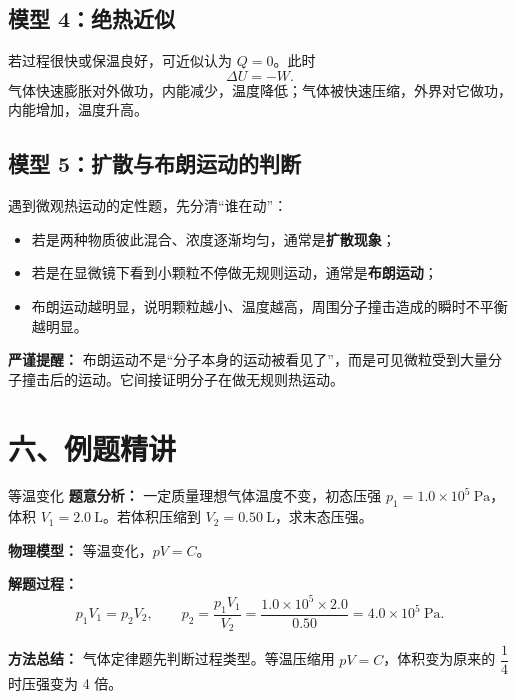 \subsection*{模型 4：绝热近似}

若过程很快或保温良好，可近似认为 $Q=0$。此时
\[
\Delta U=-W.
\]
气体快速膨胀对外做功，内能减少，温度降低；气体被快速压缩，外界对它做功，内能增加，温度升高。

\begin{center}


\label{fig:thermal-process-pv-summary}
\end{center}

\subsection*{模型 5：扩散与布朗运动的判断}

遇到微观热运动的定性题，先分清“谁在动”：
\begin{itemize}
  \item 若是两种物质彼此混合、浓度逐渐均匀，通常是\textbf{扩散现象}；
  \item 若是在显微镜下看到小颗粒不停做无规则运动，通常是\textbf{布朗运动}；
  \item 布朗运动越明显，说明颗粒越小、温度越高，周围分子撞击造成的瞬时不平衡越明显。
\end{itemize}

\textbf{严谨提醒：} 布朗运动不是“分子本身的运动被看见了”，而是可见微粒受到大量分子撞击后的运动。它间接证明分子在做无规则热运动。

\section*{六、例题精讲}

\begin{examplebox}{等温变化}
\textbf{题意分析：} 一定质量理想气体温度不变，初态压强 $p_1=1.0\times10^5\ \mathrm{Pa}$，体积 $V_1=2.0\ \mathrm{L}$。若体积压缩到 $V_2=0.50\ \mathrm{L}$，求末态压强。

\textbf{物理模型：} 等温变化，$pV=C$。

\begin{center}

\end{center}

\textbf{解题过程：}
\[
p_1V_1=p_2V_2,
\qquad
p_2=\frac{p_1V_1}{V_2}
=\frac{1.0\times10^5\times2.0}{0.50}
=4.0\times10^5\ \mathrm{Pa}.
\]

\textbf{方法总结：} 气体定律题先判断过程类型。等温压缩用 $pV=C$，体积变为原来的 $\dfrac14$ 时压强变为 4 倍。
\end{examplebox}

